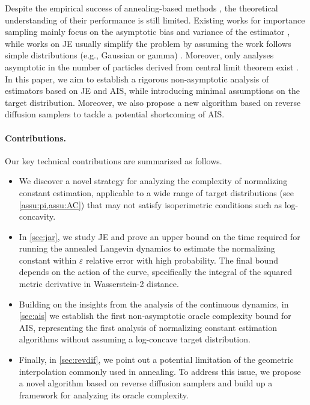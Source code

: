 Despite the empirical success of annealing-based methods \citep{ma2013estimating,krause2020algorithms,mazzanti2020efficient,yasuda2022free,chen2024ensemble,schonle2024sampling}, the theoretical understanding of their performance is still limited. Existing works for importance sampling mainly focus on the asymptotic bias and variance of the estimator \citep{meng1996simulating,gelman1998simulating}, while works on JE usually simplify the problem by assuming the work follows simple distributions (e.g., Gaussian or gamma) \citep{echeverria2012,arrar2019on}. Moreover, only analyses asymptotic in the number of particles derived from central limit theorem
exist \cite[Sec. 4.1]{lelievre2010free}. In this paper, we aim to establish a rigorous non-asymptotic analysis of estimators based on JE and AIS, while introducing minimal assumptions on the target distribution. Moreover, we also propose a new algorithm based on reverse diffusion samplers to tackle a potential shortcoming of AIS.

\paragraph{Contributions.} Our key technical contributions are summarized as follows.
\begin{itemize}[wide=0pt,itemsep=0pt, topsep=0pt,parsep=0pt,partopsep=0pt]
    \item We discover a novel strategy for analyzing the complexity of normalizing constant estimation,
    applicable to a wide range of target distributions (see \cref{assu:pi,assu:AC}) that may not satisfy isoperimetric conditions such as log-concavity.
    \item In \cref{sec:jar}, we study JE
    and prove an upper bound on the time required for running the annealed Langevin dynamics to estimate the normalizing constant within $\varepsilon$ relative error with high probability. The final bound depends on the action of the curve, specifically the integral of the squared metric derivative in Wasserstein-2 distance.
    \item Building on the insights from the analysis of the continuous dynamics, in \cref{sec:ais} we
    establish the first non-asymptotic oracle complexity bound for AIS, representing the first analysis of normalizing constant estimation algorithms without assuming a log-concave target distribution.
    \item Finally, in \cref{sec:revdif}, we point out a potential limitation of the geometric interpolation commonly used in annealing. To address this issue, we propose a novel algorithm based on reverse diffusion samplers and build up a framework for analyzing its oracle complexity.
\end{itemize}


